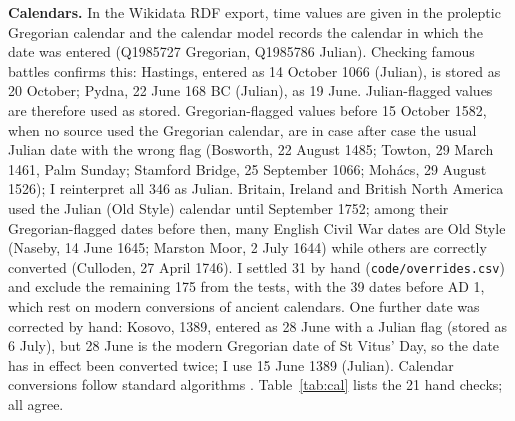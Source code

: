 \documentclass[11pt,a4paper]{article}
\begin{document}
\textbf{Calendars.} In the Wikidata RDF export, time values are given in the proleptic Gregorian calendar and the calendar model records the calendar in which the date was entered (Q1985727 Gregorian, Q1985786 Julian). Checking famous battles confirms this: Hastings, entered as 14 October 1066 (Julian), is stored as 20 October; Pydna, 22 June 168 BC (Julian), as 19 June. Julian-flagged values are therefore used as stored. Gregorian-flagged values before 15 October 1582, when no source used the Gregorian calendar, are in case after case the usual Julian date with the wrong flag (Bosworth, 22 August 1485; Towton, 29 March 1461, Palm Sunday; Stamford Bridge, 25 September 1066; Mohács, 29 August 1526); I reinterpret all 346 as Julian. Britain, Ireland and British North America used the Julian (Old Style) calendar until September 1752; among their Gregorian-flagged dates before then, many English Civil War dates are Old Style (Naseby, 14 June 1645; Marston Moor, 2 July 1644) while others are correctly converted (Culloden, 27 April 1746). I settled 31 by hand (\texttt{code/overrides.csv}) and exclude the remaining 175 from the tests, with the 39 dates before AD 1, which rest on modern conversions of ancient calendars. One further date was corrected by hand: Kosovo, 1389, entered as 28 June with a Julian flag (stored as 6 July), but 28 June is the modern Gregorian date of St Vitus' Day, so the date has in effect been converted twice; I use 15 June 1389 (Julian). Calendar conversions follow standard algorithms \citep{reingold}. Table~\ref{tab:cal} lists the 21 hand checks; all agree.
\end{document}
